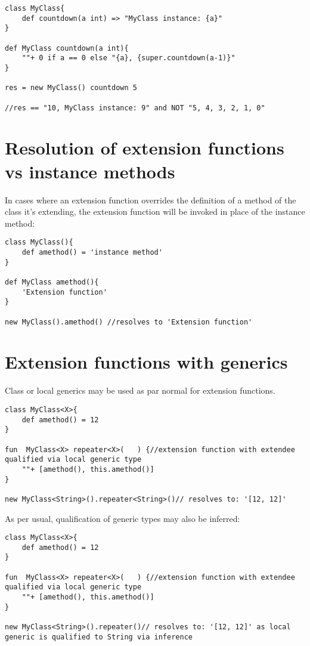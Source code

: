 \documentclass[conc-doc]{subfiles}
\begin{document}
\begin{lstlisting}
class MyClass{
	def countdown(a int) => "MyClass instance: {a}"
}

def MyClass countdown(a int){
	""+ 0 if a == 0 else "{a}, {super.countdown(a-1)}"
} 

res = new MyClass() countdown 5

//res == "10, MyClass instance: 9" and NOT "5, 4, 3, 2, 1, 0" 
\end{lstlisting}

\section{Resolution of extension functions vs instance methods}
In cases where an extension function overrides the definition of a method of the class it's extending, the extension function will be invoked in place of the instance method:

\begin{lstlisting}
class MyClass(){
	def amethod() = 'instance method'
}

def MyClass amethod(){
	'Extension function'
}

new MyClass().amethod() //resolves to 'Extension function'
\end{lstlisting}

\section{Extension functions with generics}
Class or local generics may be used as par normal for extension functions.

\begin{lstlisting}
class MyClass<X>{
	def amethod() = 12
}

fun  MyClass<X> repeater<X>(   ) {//extension function with extendee qualified via local generic type
	""+ [amethod(), this.amethod()]
}

new MyClass<String>().repeater<String>()// resolves to: '[12, 12]'
\end{lstlisting}

As per usual, qualification of generic types may also be inferred:
\begin{lstlisting}
class MyClass<X>{
	def amethod() = 12
}

fun  MyClass<X> repeater<X>(   ) {//extension function with extendee qualified via local generic type
	""+ [amethod(), this.amethod()]
}

new MyClass<String>().repeater()// resolves to: '[12, 12]' as local generic is qualified to String via inference
\end{lstlisting}
\end{document}
